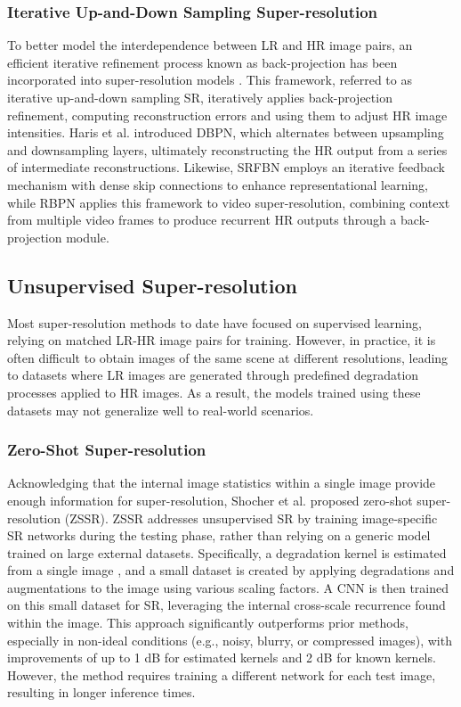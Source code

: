 \subsubsection{Iterative Up-and-Down Sampling Super-resolution}
To better model the interdependence between LR and HR image pairs, an efficient iterative refinement process known as back-projection \cite{s17} has been incorporated into super-resolution models \cite{s18}. This framework, referred to as iterative up-and-down sampling SR, iteratively applies back-projection refinement, computing reconstruction errors and using them to adjust HR image intensities. Haris et al. \cite{s19} introduced DBPN, which alternates between upsampling and downsampling layers, ultimately reconstructing the HR output from a series of intermediate reconstructions. Likewise, SRFBN \cite{s20} employs an iterative feedback mechanism with dense skip connections to enhance representational learning, while RBPN \cite{s21} applies this framework to video super-resolution, combining context from multiple video frames to produce recurrent HR outputs through a back-projection module.

\subsection{Unsupervised Super-resolution}
Most super-resolution methods to date have focused on supervised learning, relying on matched LR-HR image pairs for training. However, in practice, it is often difficult to obtain images of the same scene at different resolutions, leading to datasets where LR images are generated through predefined degradation processes applied to HR images. As a result, the models trained using these datasets may not generalize well to real-world scenarios.

\subsubsection{Zero-Shot Super-resolution}
Acknowledging that the internal image statistics within a single image provide enough information for super-resolution, Shocher et al. \cite{s22} proposed zero-shot super-resolution (ZSSR). ZSSR addresses unsupervised SR by training image-specific SR networks during the testing phase, rather than relying on a generic model trained on large external datasets. Specifically, a degradation kernel is estimated from a single image \cite{s23}, and a small dataset is created by applying degradations and augmentations to the image using various scaling factors. A CNN is then trained on this small dataset for SR, leveraging the internal cross-scale recurrence found within the image. This approach significantly outperforms prior methods, especially in non-ideal conditions (e.g., noisy, blurry, or compressed images), with improvements of up to 1 dB for estimated kernels and 2 dB for known kernels. However, the method requires training a different network for each test image, resulting in longer inference times.

